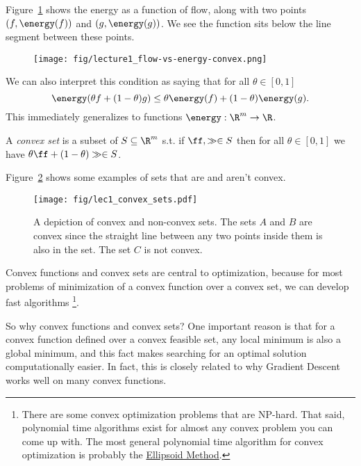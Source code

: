 Figure~\ref{fig:flow-vs-energy-convex} shows the energy as a function of flow, along with two
points $(f, \energy(f))$ and $(g,\energy(g))$. We see the function sits below the
line segment between these points.

\begin{figure}[H]
  \centering
  \texttt{[image: fig/lecture1\_flow-vs-energy-convex.png]}
  \label{fig:flow-vs-energy-convex}
\end{figure}
We can also interpret this condition as saying that for all $\theta \in [0,1]$
\[
  \energy(\theta f + (1-\theta)g) \leq \theta \energy(f) +
  (1-\theta) \energy(g)
  .
  \]
This immediately generalizes to functions $\energy:\R^m \to \R$.

A \emph{convex set} is a subset of $S \subseteq \R^m$ s.t.
if $\ff, \gg \in S$ then for all $\theta \in [0,1]$ we have
$\theta \ff + (1-\theta) \gg \in S$.

Figure~\ref{fig:convex_sets} shows some examples of sets that are and
aren't convex.

\begin{figure}[t]
\begin{centering}
                \texttt{[image: fig/lec1\_convex\_sets.pdf]}
                 \caption{A depiction of convex and non-convex sets.  The sets $A$ and $B$ are convex since the straight line between any two points inside them is also in the set.  The set $C$ is not convex.}\label{fig:convex_sets}
                 \end{centering}
\end{figure}


Convex functions and convex sets are central to optimization,
because for most problems of minimization of a convex function over a
convex set, we can develop fast algorithms \footnote{
 There are some convex optimization problems that are NP-hard.
  That said, polynomial time algorithms exist for almost any convex
  problem you can come up with.
  The most general polynomial time algorithm for convex optimization
  is probably the
  \href{https://en.wikipedia.org/wiki/Ellipsoid_method}{Ellipsoid Method}.
}.


So why convex functions and convex sets?
One important reason is that
for a convex function defined over a convex feasible set,
any local minimum is also a global minimum,
and this fact makes searching for an optimal solution
computationally easier.
In fact, this is closely related to why Gradient Descent works well
on many convex functions.


